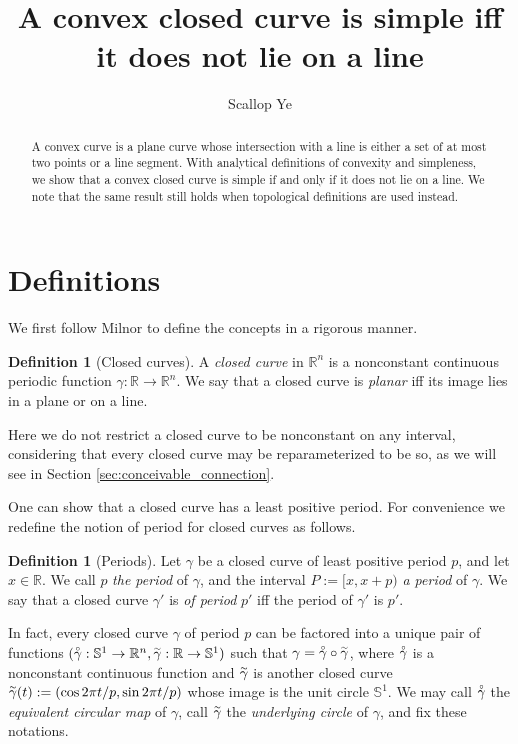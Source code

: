 \documentclass{amsart}
\title{A convex closed curve is simple iff it does not lie on a line}
\author{Scallop Ye}
\theoremstyle{definition}
\newtheorem{definition}[proposition]{Definition}
\theoremstyle{remark}
\newcommand{\lring}[1]{\accentset{\circ}{#1}}
\newcommand{\ltilde}[1]{\accentset{\sim}{#1}}
\begin{document}
\begin{abstract}
    A convex curve is a plane curve whose intersection with a
    line is either a set of at most two points or a line segment.
    With analytical definitions of convexity and simpleness,
    we show that a convex closed curve is simple
    if and only if it does not lie on a line.
    We note that the same result still holds when
    topological definitions are used instead.
\end{abstract}

\maketitle

\section{Definitions}

We first follow Milnor \cite{milnor} to
define the concepts in a rigorous manner.

\begin{definition}[Closed curves]
    A \emph{closed curve} in $\mathbb{R}^n$
    is a nonconstant continuous periodic function
    $\gamma:\mathbb{R}\to\mathbb{R}^n$. We say that a closed curve
    is \emph{planar} iff its image lies in a plane or on a line.
\end{definition}

Here we do not restrict a closed curve to be nonconstant on any interval,
considering that every closed curve may be
reparameterized to be so, as we will see in Section
\ref{sec:conceivable_connection}.

One can show that a closed curve has a least positive period.
For convenience we redefine the notion of period for closed curves
as follows.

\begin{definition}[Periods]
    Let $\gamma$ be a closed curve of least positive period $p$,
    and let $x\in\mathbb{R}$. We call $p$ \emph{the period} of $\gamma$,
    and the interval $P:=[x,x+p)$ \emph{a period} of $\gamma$.
    We say that a closed curve $\gamma'$ is \emph{of period} $p'$
    iff the period of $\gamma'$ is $p'$.
\end{definition}

In fact, every closed curve $\gamma$ of period $p$
can be factored into a unique pair of functions
$(\lring{\gamma}:\mathbb{S}^1\to\mathbb{R}^n,
    \ltilde{\gamma}:\mathbb{R}\to\mathbb{S}^1)$
such that $\gamma=\lring{\gamma}\circ\ltilde{\gamma}$,
where $\lring{\gamma}$ is a nonconstant continuous function
and $\ltilde{\gamma}$ is another closed curve
$\ltilde{\gamma}(t):=(\cos 2\pi t/p,\sin 2\pi t/p)$
whose image is the unit circle $\mathbb{S}^1$. We may call
$\lring{\gamma}$ the \emph{equivalent circular map} of $\gamma$,
call $\ltilde{\gamma}$ the \emph{underlying circle} of $\gamma$,
and fix these notations.
\end{document}
